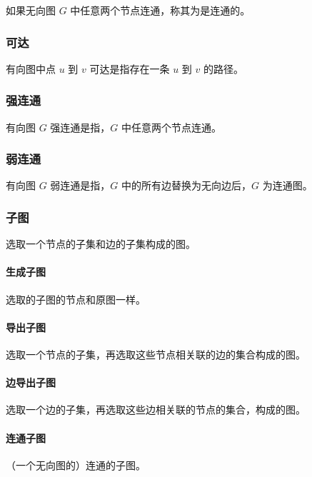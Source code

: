 如果无向图 $G$ 中任意两个节点连通，称其为是连通的。

\subsubsection{可达}

有向图中点 $u$ 到 $v$ 可达是指存在一条 $u$ 到 $v$ 的路径。

\subsubsection{ 强连通 }

有向图 $G$ 强连通是指，$G$ 中任意两个节点连通。

\subsubsection{ 弱连通 }

有向图 $G$ 弱连通是指，$G$ 中的所有边替换为无向边后，$G$ 为连通图。

\subsubsection{子图}

选取一个节点的子集和边的子集构成的图。

\paragraph{生成子图}

选取的子图的节点和原图一样。

\paragraph{导出子图}

选取一个节点的子集，再选取这些节点相关联的边的集合构成的图。

\paragraph{边导出子图}

选取一个边的子集，再选取这些边相关联的节点的集合，构成的图。

\paragraph{连通子图}

（一个无向图的）连通的子图。

